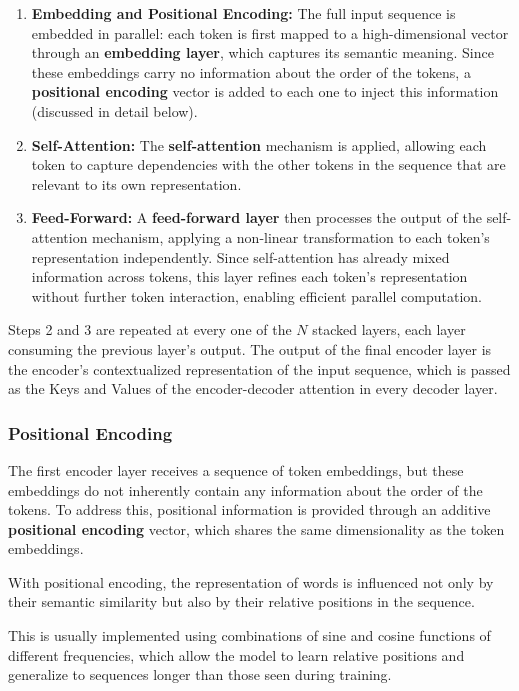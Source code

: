 \begin{enumerate}
    \item \textbf{Embedding and Positional Encoding:} The full input sequence is embedded in parallel: each token is first mapped to a high-dimensional vector through an \textbf{embedding layer}, which captures its semantic meaning. Since these embeddings carry no information about the order of the tokens, a \textbf{positional encoding} vector is added to each one to inject this information (discussed in detail below).
    \item \textbf{Self-Attention:} The \textbf{self-attention} mechanism is applied, allowing each token to capture dependencies with the other tokens in the sequence that are relevant to its own representation.
    \item \textbf{Feed-Forward:} A \textbf{feed-forward layer} then processes the output of the self-attention mechanism, applying a non-linear transformation to each token's representation independently. Since self-attention has already mixed information across tokens, this layer refines each token's representation without further token interaction, enabling efficient parallel computation.
\end{enumerate}

Steps 2 and 3 are repeated at every one of the $N$ stacked layers, each layer consuming the previous layer's output. The output of the final encoder layer is the encoder's contextualized representation of the input sequence, which is passed as the Keys and Values of the encoder-decoder attention in every decoder layer.

\subsubsection{Positional Encoding}
The first encoder layer receives a sequence of token embeddings, but these embeddings do not inherently contain any information about the order of the tokens.
To address this, positional information is provided through an additive \textbf{positional encoding} vector, which shares the same dimensionality as the token embeddings. 

With positional encoding, the representation of words is influenced not only by their semantic similarity but also by their relative positions in the sequence.

This is usually implemented using combinations of sine and cosine functions of different frequencies, which allow the model to learn relative positions and generalize to sequences longer than those seen during training.

